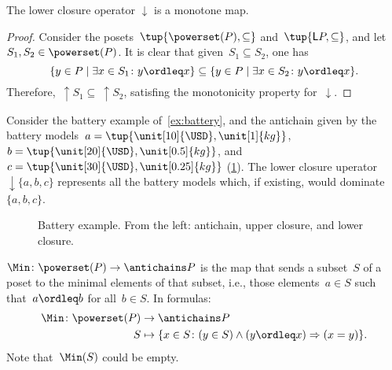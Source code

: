 \begin{lemma}
    The lower closure operator $\downarrow$ is a monotone map.
\end{lemma}

\begin{proof}
    Consider the posets~$\tup{\powerset(P),\subseteq}$ and~$\tup{\mathsf{L}P,\subseteq}$, and let~$S_1,S_2\in \powerset(P)$. It is clear that given~$S_1\subseteq S_2$, one has
    \begin{equation}
        \{y\in P\mid \exists x\in S_1\colon y\ordleq x\} \subseteq \{y\in P\mid \exists x\in S_2\colon y\ordleq x\}.
    \end{equation}
    Therefore,~$\uparrow S_1\subseteq \ \uparrow S_2$, satisfing the monotonicity property for~$\downarrow$.
\end{proof}



\begin{example}
    Consider the battery example of~\cref{ex:battery}, and the antichain given by the battery models~$a=\tup{\unit[10]{\USD},\unit[1]{kg}}$,~$b=\tup{\unit[20]{\USD},\unit[0.5]{kg}}$, and~$c=\tup{\unit[30]{\USD},\unit[0.25]{kg}}$ (\cref{fig:examplebatt}).
    The lower closure uperator~$\downarrow\{a,b,c\}$ represents all the battery models which, if existing, would dominate~$\{a,b,c\}$.

\end{example}
\begin{figure}[h!]
    \begin{center}
    \end{center}
    \caption{Battery example. From the left: antichain, upper closure, and lower closure.
    \label{fig:examplebatt}}
\end{figure}


\begin{definition}[Min]
    \label{def:Min}
    $\Min \colon \powerset(P) \to \antichains P$ is the map that sends a subset~$S$ of a poset to the minimal elements of that subset, i.e., those elements~$a \in S$ such that~$a \ordleq b$ for all~$b \in S$. In formulas:
    \begin{equation*}
        \begin{aligned}
            \Min \colon \powerset(P) &\to \antichains P\\
            S&\mapsto \{ x\in S\colon (y\in S)\wedge(y\ordleq x)\Rightarrow (x=y)\}.
        \end{aligned}
    \end{equation*}
    Note that~$\Min(S)$ could be empty.
\end{definition}

